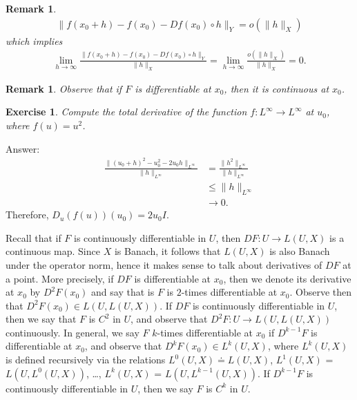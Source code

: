 \documentclass[12pt,reqno]{amsart}
\numberwithin{equation}{section}  %
\newtheorem{remark}[theorem]{Remark}
\newtheorem {exercise}[theorem]{Exercise}
\begin{document}
\begin{framed}
\begin{remark}
%
%
\begin{equation*}
\begin{split}
\| f(x_{0} + h) - f(x_{0}) - Df(x_{0}) \circ h \|_{Y} = o(\| h
\|_{X})
\end{split}
\end{equation*}
%
%
which implies
%
%
\begin{equation*}
\begin{split}
\lim_{h \to \infty} \frac{\| f(x_{0} + h) - f(x_{0}) - Df(x_{0}) \circ h
\|_{Y}}{\| h \|_{X}}  = \lim_{h \to \infty} \frac{o(\| h \|_{X})}{\| h
\|_{X}} = 0.
\end{split}
\end{equation*}
%
%
%
\label{rem:equiv-def}
\end{remark}
%
%
\end{framed}
%
%
%
\begin{framed}
%
%
\begin{remark}
Observe that if $F$ is differentiable at $x_{0}$, then it is continuous at $x_{0}$.
\label{rem:deriv-imp-cont}
\end{remark}
%
%
\end{framed}
\begin{framed}
\begin{exercise}
Compute the total
derivative of the function $f:L^{\infty} \to L^{\infty}$ at $u_{0}$,
where $f(u) = u^{2}$. 
\end{exercise}
Answer:       %
%
\begin{equation*}
\begin{split}
\frac{\| (u_{0} + h)^{2} - u_{0}^{2} - 2u_{0}h \|_{L^{\infty}}}{\| h
\|_{L^{\infty}}}
&=         \frac{\| h^{2} \|_{L^{\infty}}}{\| h \|_{L^{\infty}}}
\\
& \le \| h \|_{L^{\infty}} 
\\
& \to 0.
\end{split}
\end{equation*}
%
%
Therefore, $D_{u}(f(u))(u_{0}) = 2u_{0}I$. 
\end{framed}
Recall that if $F$ is continuously differentiable in $U$, then $DF : U \to L(U,
X)$ is a continuous map. Since $X$ is Banach, it follows that $L(U, X)$ is also
Banach under the operator norm, hence it makes sense to talk about derivatives
of $DF$ at a point. More precisely, if $DF$ is differentiable at $x_{0}$, then
we denote its derivative at $x_{0}$ by $D^{2}F(x_{0})$ and say that 
is $F$ is $2$-times differentiable at $x_{0}$.
Observe then that $D^{2}F(x_{0}) \in L(U, L(U,X))$. If $DF$ is continuously
differentiable in $U$, then we say that $F$ is $C^{2}$ in $U$, and observe that
$D^{2}F : U \to L(U, L(U, X))$ continuously. In general, we say $F$ $k$-times
differentiable at $x_{0}$ if $D^{k-1}F$ is differentiable at $x_{0}$, and
observe that $D^{k}F(x_{0}) \in L^{k}(U, X)$, where $L^{k}(U, X)$ is
defined recursively via the relations $L^{0}(U, X) \doteq L(U, X)$, $L^{1}(U,
X)$ = $L(U, L^{0}(U, X))$, \ldots, $L^{k}(U, X)$ = $L(U, L^{k-1}(U, X))$.
If $D^{k-1}F$ is
continuously differentiable in $U$, then we say $F$ is $C^{k}$ in $U$. 
\end{document}
